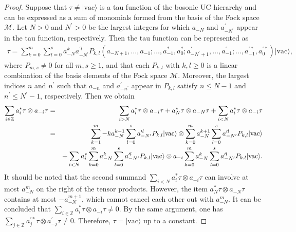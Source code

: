\documentclass[10pt,a4paper]{amsart}
\numberwithin{equation}{section}
\begin{document}
\begin{proof}
Suppose that $\tau\neq|\text{vac}\rangle$ is a tau function of the bosonic UC hierarchy  and can be expressed as a sum of monomials formed from the basis of the Fock space $\mathcal{M}$. Let $N>0$ and $N^{\prime}>0$ be the largest integers for which $a_{-N}$ and $a^{\prime}_{-N^{\prime}}$ appear in the tau function, respectively. Then the tau function can be represented as
\begin{eqnarray}
\tau=\sum\limits^{m}_{k=0}\sum\limits^{s}_{l=0}a^{k}_{-N}a^{\prime l}_{-N^{\prime}}P_{k,l}(a_{-N+1},\ldots,a_{-1};\ldots,a^{\ast}_{-1},a^{\ast}_{0};
a^{\prime}_{-N^{\prime}+1},\ldots,a^{\prime}_{-1};\ldots,a^{\prime\ast}_{-1},
a^{\prime\ast}_{0})|\text{vac}\rangle,
\end{eqnarray}
where $P_{m,s}\neq0$ for all $m,s\geq1$, and that each $P_{k,l}$ with $k,l\geq0$ is a  linear combination of the basis elements of the Fock space $\mathcal{M}$. Moreover, the largest indices $n$ and $n^{\prime}$ such that $a_{-n}$ and $a^{\prime}_{-n^{\prime}}$ appear in $P_{k,l}$  satisfy $n\leq N-1$ and $n^{\prime}\leq N^{\prime}-1$, respectively. Then we obtain
\begin{eqnarray}
\sum\limits_{i\in\mathbb{Z}}a^{\ast}_{i}\tau\otimes a_{-i}\tau&=&\sum\limits_{i>N}a^{\ast}_{i}\tau\otimes a_{-i}\tau+a^{\ast}_{N}\tau\otimes a_{-N}\tau+\sum\limits_{i<N}a^{\ast}_{i}\tau\otimes a_{-i}\tau\notag\\
&=&\sum\limits^{m}_{k=1}-ka^{k-1}_{-N}\sum\limits^{s}_{l=0}a^{\prime l}_{-N^{\prime}}P_{k,l}|\text{vac}\rangle\otimes\sum\limits^{m}_{k=0}a^{k+1}_{-N}
\sum\limits^{s}_{l=0}a^{\prime l}_{-N^{\prime}}P_{k,l}|\text{vac}\rangle\notag\\
&&+\sum\limits_{i<N}a^{\ast}_{i}\sum\limits^{m}_{k=0}a^{k}_{-N}\sum\limits^{s}_{l=0}
a^{\prime l}_{-N^{\prime}}P_{k,l}|\text{vac}\rangle\otimes a_{-i}\sum\limits^{m}_{k=0}a^{k}_{-N}\sum\limits^{s}_{l=0}
a^{\prime l}_{-N^{\prime}}P_{k,l}|\text{vac}\rangle.
\end{eqnarray}
It should be noted that the second summand $\sum\limits_{i<N}a^{\ast}_{i}\tau\otimes a_{-i}\tau$ can involve at most $a^{m}_{-N}$ on the right of the tensor products. However, the item $a^{\ast}_{N}\tau\otimes a_{-N}\tau$ contains at most $-a^{m+1}_{-N}$, which cannot cancel each other out with $a^{m}_{-N}$. It can be concluded that $\sum\limits_{i\in\mathbb{Z}}a^{\ast}_{i}\tau\otimes a_{-i}\tau\neq0$. By the same argument, one has $\sum\limits_{j\in\mathbb{Z}}a^{\prime\ast}_{j}\tau\otimes a^{\prime}_{-j}\tau\neq0$. Therefore, $\tau=|\text{vac}\rangle$ up to a constant.
\end{proof}
\end{document}
